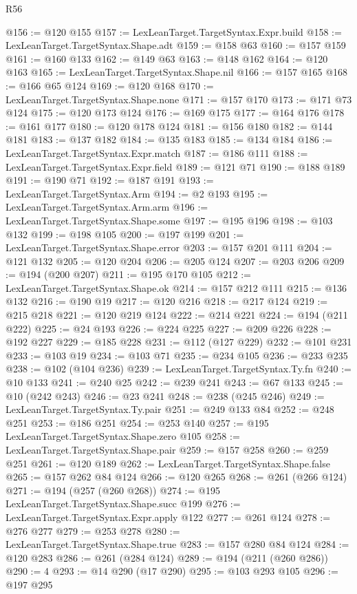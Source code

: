 \begin{lexlean}{R56}
\begin{coremodule}
@156 := @120 @155
@157 := LexLeanTarget.TargetSyntax.Expr.build
@158 := LexLeanTarget.TargetSyntax.Shape.adt
@159 := @158 @63
@160 := @157 @159
@161 := @160 @133
@162 := @149 @63
@163 := @148 @162
@164 := @120 @163
@165 := LexLeanTarget.TargetSyntax.Shape.nil
@166 := @157 @165
@168 := @166 @65 @124
@169 := @120 @168
@170 := LexLeanTarget.TargetSyntax.Shape.none
@171 := @157 @170
@173 := @171 @73 @124
@175 := @120 @173 @124
@176 := @169 @175
@177 := @164 @176
@178 := @161 @177
@180 := @120 @178 @124
@181 := @156 @180
@182 := @144 @181
@183 := @137 @182
@184 := @135 @183
@185 := @134 @184
@186 := LexLeanTarget.TargetSyntax.Expr.match
@187 := @186 @111
@188 := LexLeanTarget.TargetSyntax.Expr.field
@189 := @121 @71
@190 := @188 @189
@191 := @190 @71
@192 := @187 @191
@193 := LexLeanTarget.TargetSyntax.Arm
@194 := @2 @193
@195 := LexLeanTarget.TargetSyntax.Arm.arm
@196 := LexLeanTarget.TargetSyntax.Shape.some
@197 := @195 @196
@198 := @103 @132
@199 := @198 @105
@200 := @197 @199
@201 := LexLeanTarget.TargetSyntax.Shape.error
@203 := @157 @201 @111
@204 := @121 @132
@205 := @120 @204
@206 := @205 @124
@207 := @203 @206
@209 := @194 (@200 @207)
@211 := @195 @170 @105
@212 := LexLeanTarget.TargetSyntax.Shape.ok
@214 := @157 @212 @111
@215 := @136 @132
@216 := @190 @19
@217 := @120 @216
@218 := @217 @124
@219 := @215 @218
@221 := @120 @219 @124
@222 := @214 @221
@224 := @194 (@211 @222)
@225 := @24 @193
@226 := @224 @225
@227 := @209 @226
@228 := @192 @227
@229 := @185 @228
@231 := @112 (@127 @229)
@232 := @101 @231
@233 := @103 @19
@234 := @103 @71
@235 := @234 @105
@236 := @233 @235
@238 := @102 (@104 @236)
@239 := LexLeanTarget.TargetSyntax.Ty.fn
@240 := @10 @133
@241 := @240 @25
@242 := @239 @241
@243 := @67 @133
@245 := @10 (@242 @243)
@246 := @23 @241
@248 := @238 (@245 @246)
@249 := LexLeanTarget.TargetSyntax.Ty.pair
@251 := @249 @133 @84
@252 := @248 @251
@253 := @186 @251
@254 := @253 @140
@257 := @195 LexLeanTarget.TargetSyntax.Shape.zero @105
@258 := LexLeanTarget.TargetSyntax.Shape.pair
@259 := @157 @258
@260 := @259 @251
@261 := @120 @189
@262 := LexLeanTarget.TargetSyntax.Shape.false
@265 := @157 @262 @84 @124
@266 := @120 @265
@268 := @261 (@266 @124)
@271 := @194 (@257 (@260 @268))
@274 := @195 LexLeanTarget.TargetSyntax.Shape.succ @199
@276 := LexLeanTarget.TargetSyntax.Expr.apply @122
@277 := @261 @124
@278 := @276 @277
@279 := @253 @278
@280 := LexLeanTarget.TargetSyntax.Shape.true
@283 := @157 @280 @84 @124
@284 := @120 @283
@286 := @261 (@284 @124)
@289 := @194 (@211 (@260 @286))
@290 := 4
@293 := @14 @290 (@17 @290)
@295 := @103 @293 @105
@296 := @197 @295

\end{coremodule}
\end{lexlean}
